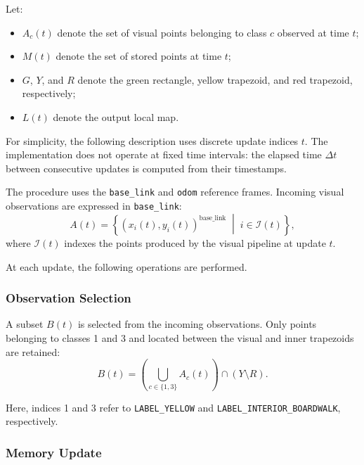 \documentclass[a4paper,11pt,oneside]{book}
\begin{document}
Let:
\begin{itemize}
    \item $A_c(t)$ denote the set of visual points belonging
    to class $c$ observed at time $t$;

    \item $M(t)$ denote the set of stored points at time $t$;

    \item $G$, $Y$, and $R$ denote the green rectangle,
    yellow trapezoid, and red trapezoid, respectively;

    \item $L(t)$ denote the output local map.
\end{itemize}

For simplicity, the following description uses discrete update
indices $t$. The implementation does not operate at fixed time
intervals: the elapsed time $\Delta t$ between consecutive updates
is computed from their timestamps.

The procedure uses the \texttt{base\_link} and \texttt{odom}
reference frames. Incoming visual observations are expressed
in \texttt{base\_link}:
\begin{equation}
    A(t)
    =
    \left\{
        \left(x_i(t),y_i(t)\right)^{\mathrm{base\_link}}
        \;\middle|\;
        i\in\mathcal{I}(t)
    \right\},
    \label{eq:local_mapping_observations}
\end{equation}
where $\mathcal{I}(t)$ indexes the points produced by the visual
pipeline at update $t$.

At each update, the following operations are performed.

\subsubsection{Observation Selection}

A subset $B(t)$ is selected from the incoming observations.
Only points belonging to classes 1 and 3 and located between
the visual and inner trapezoids are retained:
\begin{equation}
    B(t)
    =
    \left(
        \bigcup_{c\in\{1,3\}}A_c(t)
    \right)
    \cap
    \left(Y\setminus R\right).
    \label{eq:local_mapping_selection}
\end{equation}

Here, indices 1 and 3 refer to \texttt{LABEL\_YELLOW} and
\texttt{LABEL\_INTERIOR\_BOARDWALK}, respectively.

\subsubsection{Memory Update}
\end{document}
